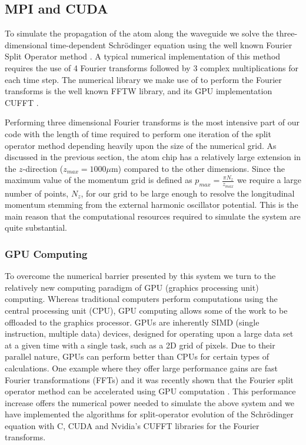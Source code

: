 \subsection{MPI and CUDA}
\label{sec:MPICUDA}

To simulate the propagation of the atom along the waveguide we solve the three-dimensional time-dependent Schr\"odinger equation using the well known Fourier Split Operator method \cite{Fleck:splitop}. A typical numerical implementation of this method requires the use of 4 Fourier transforms followed by 3 complex multiplications for each time step. The numerical library we make use of to perform the Fourier transforms is the well known FFTW library, and its GPU implementation CUFFT \cite{Nvidia:cufft_4_1}.

Performing three dimensional Fourier transforms is the most intensive part of our code with the length of time required to perform one iteration of the split operator method depending heavily upon the size of the numerical grid. As discussed in the previous section, the atom chip has a relatively large extension in the $z$-direction  ($z_{max}=1000 \mu$m) compared to the other dimensions. Since the maximum value of the momentum grid is defined as $p_{max} = \frac{\pi N_z}{z_{max}}$ we require a large number of points, $N_z$, for our grid to be large enough to resolve the longitudinal momentum stemming from the external harmonic oscillator potential. This is the main reason that the computational resources required to simulate the system are quite substantial.

\subsubsection{GPU Computing}

To overcome the numerical barrier presented by this system we turn to the relatively new computing paradigm of GPU (graphics processing unit) computing. Whereas traditional computers perform computations using the central processing unit (CPU), GPU computing allows some of the work to be offloaded to the graphics processor. GPUs are inherently SIMD (single instruction, multiple data) devices, designed for operating upon a large data set at a given time with a single task, such as a 2D grid of pixels. Due to their parallel nature, GPUs can perform better than CPUs for certain types of calculations. One example where they offer large performance gains are fast Fourier transformations (FFTs) and it was recently shown that the Fourier split operator method can be accelerated using GPU computation \cite{Bauke:11}. This performance increase offers the numerical power needed to simulate the above system and we have implemented the algorithms for split-operator evolution of the Schr\"odinger equation with C, CUDA and Nvidia's CUFFT libraries for the Fourier transforms.

